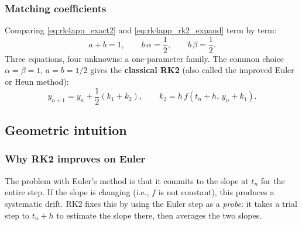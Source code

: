 \documentclass[12pt,a4paper]{article}
\theoremstyle{definition}
\theoremstyle{plain}
\theoremstyle{remark}
\begin{document}
\subsubsection{Matching coefficients}

Comparing \eqref{eq:rk4app_exact2} and \eqref{eq:rk4app_rk2_expand} term by term:
\begin{equation}\label{eq:rk4app_rk2_conditions}
  \boxed{a + b = 1, \qquad b\,\alpha = \frac{1}{2}, \qquad b\,\beta = \frac{1}{2}.}
\end{equation}
Three equations, four unknowns: a one-parameter family. The common choice $\alpha = \beta = 1$, $a = b = 1/2$ gives the \textbf{classical RK2} (also called the improved Euler or Heun method):
\begin{equation}
  y_{n+1} = y_n + \frac{1}{2}(k_1 + k_2), \qquad k_2 = h\,f(t_n + h, \, y_n + k_1).
\end{equation}

\subsection{Geometric intuition}

\subsubsection{Why RK2 improves on Euler}

The problem with Euler's method is that it commits to the slope at $t_n$ for the entire step. If the slope is changing (i.e., $f$ is not constant), this produces a systematic drift. RK2 fixes this by using the Euler step as a \emph{probe}: it takes a trial step to $t_n + h$ to estimate the slope there, then averages the two slopes.
\end{document}

